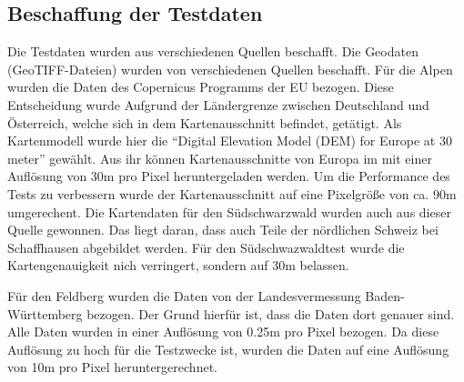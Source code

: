 \subsection{Beschaffung der Testdaten}\label{subsec:beschaffung_der_testdaten}
Die Testdaten wurden aus verschiedenen Quellen beschafft. Die Geodaten (GeoTIFF-Dateien) wurden von verschiedenen Quellen beschafft. Für die Alpen wurden die Daten des Copernicus Programms der EU  bezogen. Diese Entscheidung wurde Aufgrund der Ländergrenze zwischen Deutschland und Österreich, welche sich in dem Kartenausschnitt befindet, getätigt. Als Kartenmodell wurde hier die \enquote{Digital Elevation Model (DEM) for Europe at 30 meter} gewählt. Aus ihr können Kartenausschnitte von Europa im mit einer Auflösung von 30m pro Pixel heruntergeladen werden. Um die Performance des Tests zu verbessern wurde der Kartenausschnitt auf eine Pixelgröße von ca. 90m umgerechent. Die Kartendaten für den Südschwarzwald wurden auch aus dieser Quelle gewonnen. Das liegt daran, dass auch Teile der nördlichen Schweiz bei Schaffhausen abgebildet werden. Für den Südschwazwaldtest wurde die Kartengenauigkeit nich verringert, sondern auf 30m belassen.

Für den Feldberg wurden die Daten von der Landesvermessung Baden-Württemberg bezogen. Der Grund hierfür ist, dass die Daten dort genauer sind. Alle Daten wurden in einer Auflösung von 0.25m pro Pixel bezogen. Da diese Auflösung zu hoch für die Testzwecke ist, wurden die Daten auf eine Auflösung von 10m pro Pixel heruntergerechnet.


